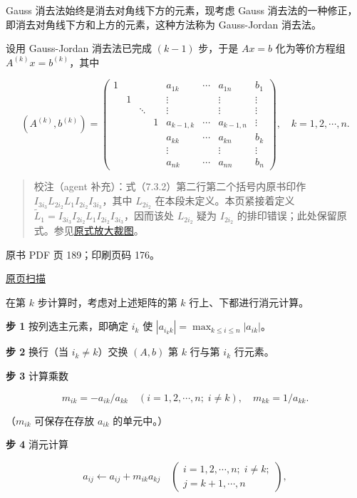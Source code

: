 Gauss 消去法始终是消去对角线下方的元素，现考虑 Gauss 消去法的一种修正，即消去对角线下方和上方的元素，这种方法称为 Gauss-Jordan 消去法。

设用 Gauss-Jordan 消去法已完成 \((k-1)\) 步，于是 \(Ax=b\) 化为等价方程组 \(A^{(k)}x=b^{(k)}\)，其中

\[
(A^{(k)},b^{(k)})=\left(\begin{array}{ccccccc|c}
1&&&&a_{1k}&\cdots&a_{1n}&b_1\\
&1&&&\vdots&&\vdots&\vdots\\
&&\ddots&&\vdots&&\vdots&\vdots\\
&&&1&a_{k-1,k}&\cdots&a_{k-1,n}&\vdots\\
&&&&a_{kk}&\cdots&a_{kn}&b_k\\
&&&&\vdots&&\vdots&\vdots\\
&&&&a_{nk}&\cdots&a_{nn}&b_n
\end{array}\right),\quad k=1,2,\cdots,n.
\]

\begin{quote}
校注（agent 补充）：式（7.3.2）第二行第二个括号内原书印作 \(I_{3i_3}L_{2i_2}L_1I_{2i_2}I_{3i_3}\)，其中 \(L_{2i_2}\) 在本段未定义。本页紧接着定义 \(\widetilde{L}_1=I_{3i_3}I_{2i_2}L_1I_{2i_2}I_{3i_3}\)，因而该处 \(L_{2i_2}\) 疑为 \(I_{2i_2}\) 的排印错误；此处保留原式。参见\href{verified/assets/ch07a/pdf-188-permutation-detail.png}{原式放大裁图}。
\end{quote}

\clearpage

原书 PDF 页 189；印刷页码 176。

\href{source-images/pdf-189.jpeg}{原页扫描}

在第 \(k\) 步计算时，考虑对上述矩阵的第 \(k\) 行上、下都进行消元计算。

\textbf{步 1} 按列选主元素，即确定 \(i_k\) 使 \(|a_{i_kk}|=\max_{k\le i\le n}|a_{ik}|\)。

\textbf{步 2} 换行（当 \(i_k\ne k\)）交换 \((A,b)\) 第 \(k\) 行与第 \(i_k\) 行元素。

\textbf{步 3} 计算乘数

\[m_{ik}=-a_{ik}/a_{kk}\quad(i=1,2,\cdots,n;\;i\ne k),\quad m_{kk}=1/a_{kk}.\]

（\(m_{ik}\) 可保存在存放 \(a_{ik}\) 的单元中。）

\textbf{步 4} 消元计算

\[a_{ij}\leftarrow a_{ij}+m_{ik}a_{kj}\quad
\left(\begin{array}{l}i=1,2,\cdots,n;\;i\ne k;\\j=k+1,\cdots,n\end{array}\right),\]

